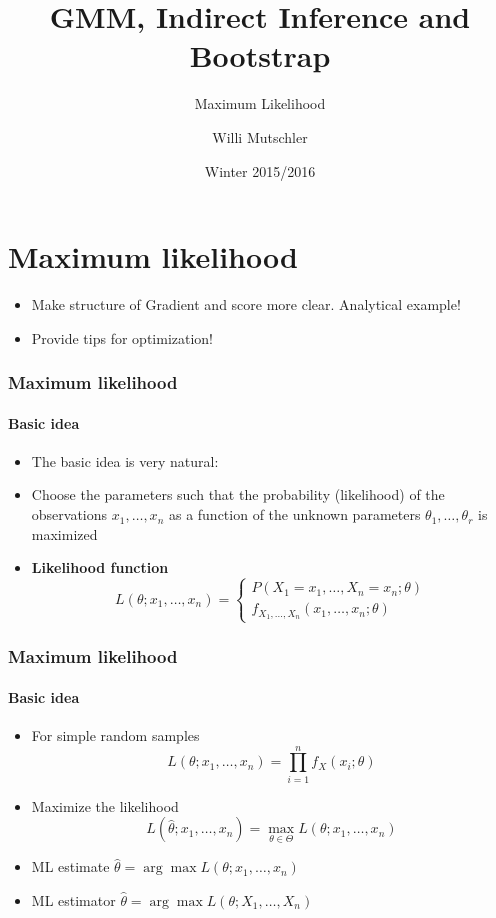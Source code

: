 \documentclass[notes=show]{beamer}
\begin{document}
\title{GMM, Indirect Inference and Bootstrap}
\subtitle{Maximum Likelihood}
\author[Willi Mutschler]{Willi Mutschler}
\date{Winter 2015/2016}
\maketitle

\section{Maximum likelihood}
\begin{frame}
\begin{itemize}
  \item Make structure of Gradient and score more clear. Analytical example!
  \item Provide tips for optimization!
\end{itemize}
\end{frame}

\begin{frame}\frametitle{Maximum likelihood}\framesubtitle{Basic idea}
\begin{itemize}
    \item The basic idea is very natural:
    \item Choose the parameters such that the probability (likelihood) of the observations $x_{1},\ldots ,x_{n}$ as a function of the unknown parameters $\theta _{1},\ldots ,\theta _{r}$ is maximized
    \item \textbf{Likelihood function}
    \begin{equation*}
        L(\theta ;x_{1},\dots ,x_{n})=\left\{
    \begin{array}{l}
        P(X_{1}=x_{1},\ldots ,X_{n}=x_{n};\theta ) \\[3mm]
        f_{X_{1},\dots ,X_{n}}(x_{1},\dots ,x_{n};\theta )%
    \end{array}
    \right.
    \end{equation*}
\end{itemize}
\end{frame}


\begin{frame}\frametitle{Maximum likelihood}\framesubtitle{Basic idea}
\begin{itemize}
    \item For simple random samples
    \begin{equation*}
        L(\theta ;x_{1},\dots ,x_{n})=\prod_{i=1}^{n}f_{X}(x_{i};\theta )
    \end{equation*}
    \item Maximize the likelihood
    \begin{equation*}
    L(\hat{\theta};x_{1},\ldots ,x_{n})=\max\limits_{\theta \in \Theta }L(\theta;x_{1},\ldots ,x_{n})
    \end{equation*}
    \item ML estimate $\hat{\theta}=\arg \max L(\theta ;x_{1},\ldots ,x_{n})$
    \item ML estimator $\hat{\theta}=\arg \max L(\theta ;X_{1},\ldots ,X_{n})$
\end{itemize}
\end{frame}
\end{document}
